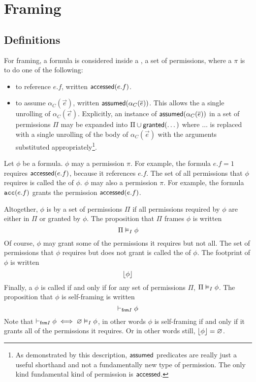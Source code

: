\newpage
\section{Framing}

\subsection{Definitions}

For framing, a formula is considered inside a , a set of permissions, where a  $\pi$ is to do one of the following:
\begin{itemize}
  \item to reference $e.f$, written $\textsf{accessed}(e.f)$.
  \item to assume $\alpha_C(\vec{e})$, written $\textsf{assumed}(\alpha_C(\overline{e}))$. This allows the a single unrolling of $\alpha_C(\vec{e})$. Explicitly, an instance of $\textsf{assumed}(\alpha_C(\overline{e}))$ in a set of permissions $\Pi$ may be expanded into $\Pi \cup \textsf{granted}( \dots )$ where $\dots$ is replaced with a single unrolling of the body of $\alpha_C(\vec{e})$ with the arguments substituted appropriately\footnote{As demonstrated by this description, $\textsf{assumed}$ predicates are really just a useful shorthand and not a fundamentally new type of permission. The only kind fundamental kind of permission is $\textsf{accessed}$.}.
\end{itemize}
%
Let $\phi$ be a formula.
$\phi$ may  a permission $\pi$. For example, the formula $e.f = 1$ requires $\textsf{accessed}(e.f)$, because it references $e.f$. The set of all permissions that $\phi$ requires is called the  of $\phi$. $\phi$ may also  a permission $\pi$. For example, the formula $\texttt{acc}(e.f)$ grants the permission $\textsf{accessed}(e.f)$.

Altogether, $\phi$ is  by a set of permissions $\Pi$ if all permissions required by $\phi$ are either in $\Pi$ or granted by $\phi$. The proposition that $\Pi$ frames $\phi$ is written
$$
  \Pi \vDash_I \phi
$$
Of course, $\phi$ may grant some of the permissions it requires but not all. The set of permissions that $\phi$ requires but does not grant is called the  of $\phi$. The footprint of $\phi$ is written
$$
  \lfloor \phi \rfloor
$$
Finally, a $\phi$ is called  if and only if for any set of permissions $\Pi$, $\Pi \vDash_I \phi$. The proposition that $\phi$ is self-framing is written
$$
  \vdash_{\textsf{frm}I} \phi
$$
Note that $\vdash_{\textsf{frm}I} \phi \iff \varnothing \vDash_I \phi$, in other words $\phi$ is self-framing if and only if it grants all of the permissions it requires. Or in other words still, $\lfloor \phi \rfloor = \varnothing$.

